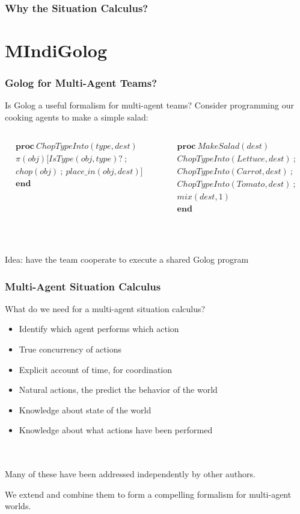 \documentclass{beamer}
\begin{document}
\begin{frame}
\frametitle{Why the Situation Calculus?}

\end{frame}

\section{MIndiGolog}

\begin{frame}
\frametitle{Golog for Multi-Agent Teams?}
Is Golog a useful formalism for multi-agent teams?
Consider programming our cooking agents to make a simple salad:
\ \\
\begin{columns}
  \begin{column}{0.5\textwidth}
\[
\begin{array}{c}
\mathbf{proc}\ ChopTypeInto(type,dest)\\
\pi(obj)[IsType(obj,type)?\ ;\\
chop(obj)\ ;\ place\_in(obj,dest)]\\
\mathbf{end}\end{array}\]
  \end{column}
  \begin{column}{0.5\textwidth}
\[
\begin{array}{c}
\mathbf{proc}\ MakeSalad(dest)\\
ChopTypeInto(Lettuce,dest)\ ;\\
ChopTypeInto(Carrot,dest)\ ;\\
ChopTypeInto(Tomato,dest)\ ;\\
mix(dest,1)\\
\mathbf{end}\end{array}\]
  \end{column}
\end{columns}
\ \\
\ \\
\pause
\alert{Idea}:  have the team cooperate to execute a shared Golog program
\end{frame}

\begin{frame}
\frametitle{Multi-Agent Situation Calculus}
What do we need for a multi-agent situation calculus?
\begin{itemize}
  \item Identify which agent performs which action
  \item True concurrency of actions
  \item Explicit account of time, for coordination
  \item Natural actions, the predict the behavior of the world
  \item Knowledge about state of the world
  \item Knowledge about what actions have been performed
\end{itemize}
\ \\
\ \\
\pause
Many of these have been addressed independently by other authors.

We extend and combine them to form a compelling formalism for multi-agent
worlds.
\end{frame}
\end{document}
